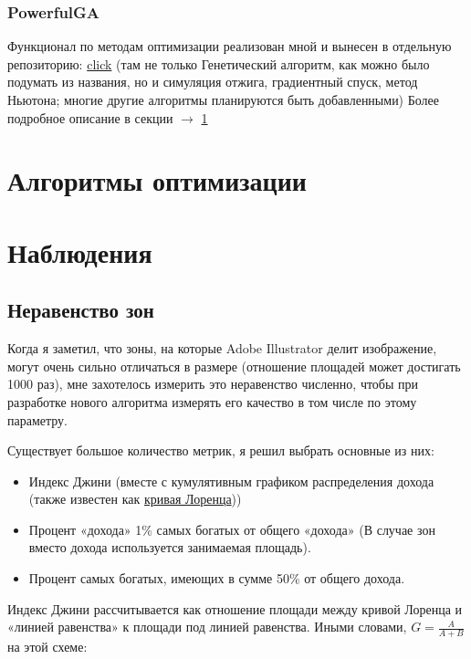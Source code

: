\documentclass[11pt]{article}
\begin{document}
    \subsubsection{PowerfulGA}
    Функционал по методам оптимизации реализован мной и вынесен в отдельную репозиторию: \href{https://github.com/donRumata03/PowerfulGA}{click}
    (там не только Генетический алгоритм, как можно было подумать из названия, но и симуляция отжига, градиентный спуск, метод Ньютона;
    многие другие алгоритмы планируются быть добавленными)
    Более подробное описание в секции $\longrightarrow$ \ref{sec:opimization_algorithms}

    \section {Алгоритмы оптимизации}\label{sec:opimization_algorithms}
    

    \section{Наблюдения}\label{sec:observations}

    \subsection{Неравенство зон}\label{subsec:inequality}
    Когда я заметил, что зоны, на которые Adobe Illustrator делит изображение, могут очень сильно отличаться в размере (отношение площадей может достигать 1000 раз),
    мне захотелось измерить это неравенство численно, чтобы при разработке нового алгоритма измерять его качество в том числе по этому параметру.

    Существует большое количество метрик, я решил выбрать основные из них:
    \begin{itemize}
        \item Индекс Джини (вместе с кумулятивным графиком распределения дохода (также известен как \href{https://en.wikipedia.org/wiki/Lorenz_curve}{кривая Лоренца}))
        \item Процент «дохода» 1\% самых богатых от общего «дохода» (В случае зон вместо дохода используется занимаемая площадь).
        \item Процент самых богатых, имеющих в сумме 50\% от общего дохода.
    \end{itemize}

    Индекс Джини рассчитывается как отношение площади между кривой Лоренца и «линией равенства» к площади под линией равенства.
    Иными словами, $G = \frac{A}{A + B}$ на этой схеме:
\end{document}
